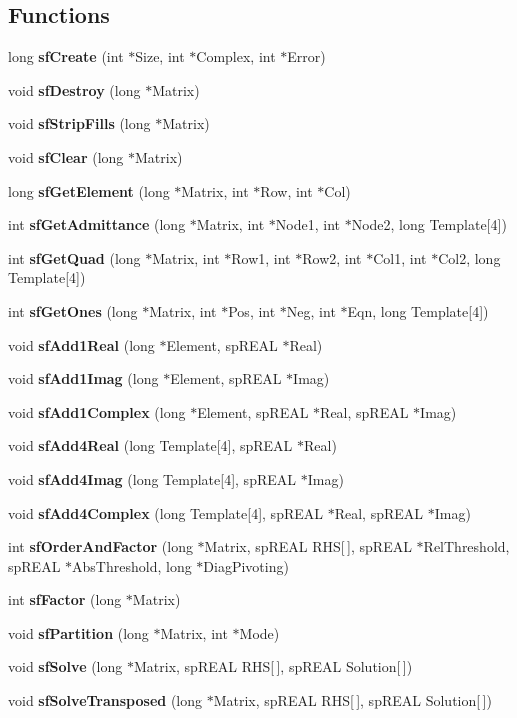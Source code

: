 \subsection*{Functions}
\begin{CompactItemize}
\item 
long {\bf sf\-Create} (int $\ast$Size, int $\ast$Complex, int $\ast$Error)
\item 
void {\bf sf\-Destroy} (long $\ast$Matrix)
\item 
void {\bf sf\-Strip\-Fills} (long $\ast$Matrix)
\item 
void {\bf sf\-Clear} (long $\ast$Matrix)
\item 
long {\bf sf\-Get\-Element} (long $\ast$Matrix, int $\ast$Row, int $\ast$Col)
\item 
int {\bf sf\-Get\-Admittance} (long $\ast$Matrix, int $\ast$Node1, int $\ast$Node2, long Template[4])
\item 
int {\bf sf\-Get\-Quad} (long $\ast$Matrix, int $\ast$Row1, int $\ast$Row2, int $\ast$Col1, int $\ast$Col2, long Template[4])
\item 
int {\bf sf\-Get\-Ones} (long $\ast$Matrix, int $\ast$Pos, int $\ast$Neg, int $\ast$Eqn, long Template[4])
\item 
void {\bf sf\-Add1Real} (long $\ast$Element, sp\-REAL $\ast$Real)
\item 
void {\bf sf\-Add1Imag} (long $\ast$Element, sp\-REAL $\ast$Imag)
\item 
void {\bf sf\-Add1Complex} (long $\ast$Element, sp\-REAL $\ast$Real, sp\-REAL $\ast$Imag)
\item 
void {\bf sf\-Add4Real} (long Template[4], sp\-REAL $\ast$Real)
\item 
void {\bf sf\-Add4Imag} (long Template[4], sp\-REAL $\ast$Imag)
\item 
void {\bf sf\-Add4Complex} (long Template[4], sp\-REAL $\ast$Real, sp\-REAL $\ast$Imag)
\item 
int {\bf sf\-Order\-And\-Factor} (long $\ast$Matrix, sp\-REAL RHS[$\,$], sp\-REAL $\ast$Rel\-Threshold, sp\-REAL $\ast$Abs\-Threshold, long $\ast$Diag\-Pivoting)
\item 
int {\bf sf\-Factor} (long $\ast$Matrix)
\item 
void {\bf sf\-Partition} (long $\ast$Matrix, int $\ast$Mode)
\item 
void {\bf sf\-Solve} (long $\ast$Matrix, sp\-REAL RHS[$\,$], sp\-REAL Solution[$\,$])
\item 
void {\bf sf\-Solve\-Transposed} (long $\ast$Matrix, sp\-REAL RHS[$\,$], sp\-REAL Solution[$\,$])

\end{CompactItemize}
